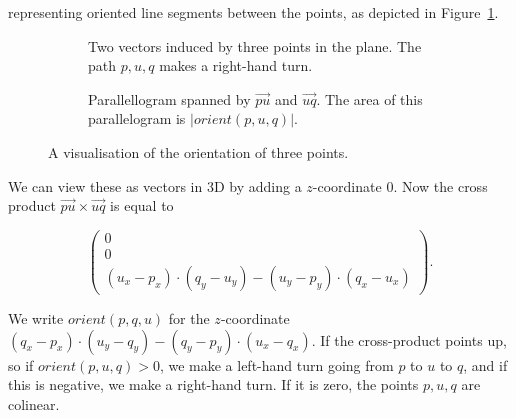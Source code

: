 representing oriented line segments between the points, as depicted in
Figure~\ref{fig:orient1}.

\begin{figure}[ht]
    \begin{subfigure}{0.45\textwidth}
    \caption{Two vectors induced by three points in the plane. The path 
             $p, u, q$ makes a right-hand turn.}
    \label{fig:orient1}
    \end{subfigure}\hfill
    \begin{subfigure}{0.45\textwidth}
    \caption{Parallellogram spanned by $\vec{pu}$ and $\vec{uq}$. 
             The area of this parallelogram is $|orient(p, u, q)|$.}
    \label{fig:orient2}
    \end{subfigure}
    \caption{A visualisation of the orientation of three points.}
\end{figure}

We can view these as vectors in 3D by adding a $z$-coordinate $0$. Now the
cross product $\vec{pu} \times \vec{uq}$ is equal to 

\[
    \begin{pmatrix}
        0 \\
        0 \\
        (u_x - p_x) \cdot (q_y - u_y) - (u_y - p_y) \cdot (q_x - u_x)
    \end{pmatrix}.
\]

We write $orient(p, q, u)$ for the $z$-coordinate
$(q_x - p_x) \cdot (u_y - q_y) - (q_y - p_y) \cdot (u_x - q_x)$. 
If the cross-product points up, so if $orient(p, u, q) > 0$, we make a left-hand 
turn going from $p$ to $u$ to $q$, and if this is negative, we make a right-hand
turn. If it is zero, the points $p, u, q$ are colinear. 

